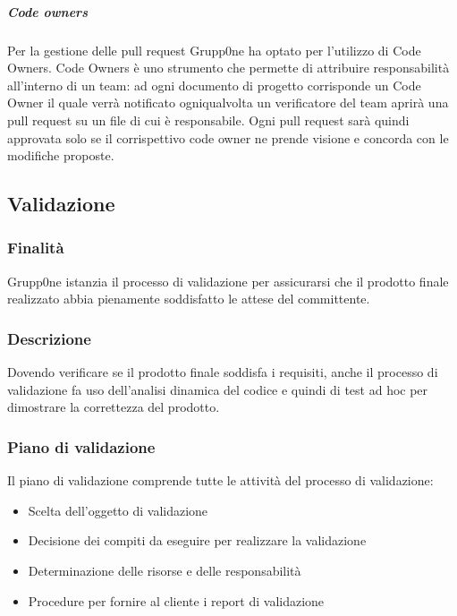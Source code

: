 \documentclass[../norme-di-progetto.tex]{subfiles}
\begin{document}
\subparagraph{Code owners}%
\label{subp:code owners}

Per la gestione delle pull request Grupp0ne ha optato per l'utilizzo di Code Owners. Code Owners è uno strumento che permette di attribuire responsabilità all'interno di un team: ad ogni documento di progetto corrisponde un Code Owner il quale verrà notificato ogniqualvolta un verificatore del team aprirà una pull request su un file di cui è responsabile. Ogni pull request sarà quindi approvata solo se il corrispettivo code owner ne prende visione e concorda con le modifiche proposte.

\subsection{Validazione}%
\label{sub:validazione}

\subsubsection{Finalità}%
\label{subs:validazione/finalita}

Grupp0ne istanzia il processo di validazione per assicurarsi che il prodotto finale realizzato abbia pienamente soddisfatto le attese del committente.

\subsubsection{Descrizione}%
\label{subs:validazione/descrizione}

Dovendo verificare se il prodotto finale soddisfa i requisiti, anche il processo di validazione fa uso dell'analisi dinamica del codice e quindi di test ad hoc per dimostrare la correttezza del prodotto.

\subsubsection{Piano di validazione}%
\label{subs:piano di validazione}

Il piano di validazione comprende tutte le attività del processo di validazione:

\begin{itemize}
  \item Scelta dell'oggetto di validazione
  \item Decisione dei compiti da eseguire per realizzare la validazione
  \item Determinazione delle risorse e delle responsabilità
  \item Procedure per fornire al cliente i report di validazione
\end{itemize}
\end{document}
